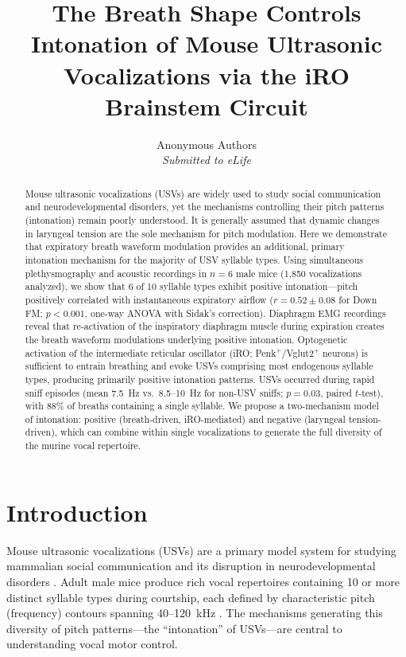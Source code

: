 \documentclass[11pt]{article}
\title{The Breath Shape Controls Intonation of Mouse Ultrasonic Vocalizations via the iRO Brainstem Circuit}
\author{
  Anonymous Authors\\
  \textit{Submitted to eLife}
}
\date{}
\begin{document}
\maketitle

\begin{abstract}
Mouse ultrasonic vocalizations (USVs) are widely used to study social communication and neurodevelopmental disorders, yet the mechanisms controlling their pitch patterns (intonation) remain poorly understood. It is generally assumed that dynamic changes in laryngeal tension are the sole mechanism for pitch modulation. Here we demonstrate that expiratory breath waveform modulation provides an additional, primary intonation mechanism for the majority of USV syllable types. Using simultaneous plethysmography and acoustic recordings in $n = 6$ male mice (1,850 vocalizations analyzed), we show that 6 of 10 syllable types exhibit positive intonation---pitch positively correlated with instantaneous expiratory airflow ($r = 0.52 \pm 0.08$ for Down FM; $p < 0.001$, one-way ANOVA with Sidak's correction). Diaphragm EMG recordings reveal that re-activation of the inspiratory diaphragm muscle during expiration creates the breath waveform modulations underlying positive intonation. Optogenetic activation of the intermediate reticular oscillator (iRO; Penk$^+$/Vglut2$^+$ neurons) is sufficient to entrain breathing and evoke USVs comprising most endogenous syllable types, producing primarily positive intonation patterns. USVs occurred during rapid sniff episodes (mean 7.5~Hz vs.\ 8.5--10~Hz for non-USV sniffs; $p = 0.03$, paired $t$-test), with 88\% of breaths containing a single syllable. We propose a two-mechanism model of intonation: positive (breath-driven, iRO-mediated) and negative (laryngeal tension-driven), which can combine within single vocalizations to generate the full diversity of the murine vocal repertoire.
\end{abstract}

\section{Introduction}

Mouse ultrasonic vocalizations (USVs) are a primary model system for studying mammalian social communication and its disruption in neurodevelopmental disorders \citep{holy2005ultrasonic, portfors2007types, hage2013murine}. Adult male mice produce rich vocal repertoires containing 10 or more distinct syllable types during courtship, each defined by characteristic pitch (frequency) contours spanning 40--120~kHz \citep{grimsley2011auditory, arriaga2012mouse}. The mechanisms generating this diversity of pitch patterns---the ``intonation'' of USVs---are central to understanding vocal motor control.
\end{document}
